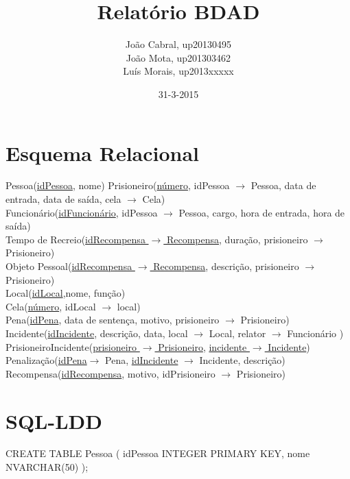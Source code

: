 \documentclass{article}
\title{Relatório BDAD}
\date{31-3-2015}
\author{João Cabral, up20130495\\
	   João Mota, up201303462\\
	   Luís Morais, up2013xxxxx}
\begin{document}
\maketitle
{}
\newpage
{}

\section{Esquema Relacional}
Pessoa(\underline{idPessoa}, nome)
Prisioneiro(\underline{número}, idPessoa $\rightarrow$ Pessoa, data de entrada, data de saída, cela $\rightarrow$ Cela)\\
Funcionário(\underline{idFuncionário}, idPessoa $\rightarrow$ Pessoa, cargo, hora de entrada, hora de saída)\\
Tempo de Recreio(\underline{idRecompensa $\rightarrow$ Recompensa}, duração, prisioneiro $\rightarrow$ Prisioneiro)\\
Objeto Pessoal(\underline{idRecompensa $\rightarrow$ Recompensa}, descrição, prisioneiro $\rightarrow$ Prisioneiro)\\
Local(\underline{idLocal},nome, função)\\
Cela(\underline{número}, idLocal $\rightarrow$ local)\\
Pena(\underline{idPena}, data de sentença, motivo, prisioneiro $\rightarrow$ Prisioneiro)\\
Incidente(\underline{idIncidente}, descrição, data, local $\rightarrow$ Local, relator $\rightarrow$ Funcionário )\\
PrisioneiroIncidente(\underline{prisioneiro $\rightarrow$ Prisioneiro}, \underline{incidente $\rightarrow$ Incidente})\\
Penalização(\underline{idPena}$\rightarrow$ Pena, \underline{idIncidente} $\rightarrow$ Incidente, descrição)\\
Recompensa(\underline{idRecompensa}, motivo, idPrisioneiro $\rightarrow$ Prisioneiro)\\


\section{SQL-LDD}


CREATE TABLE Pessoa (\newline
idPessoa	INTEGER PRIMARY KEY,\newline
nome		NVARCHAR(50)\newline
);\\
\end{document}
